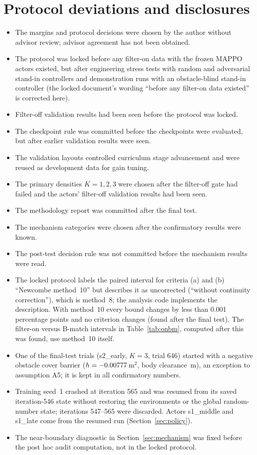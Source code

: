 \documentclass[journal]{IEEEtran}
\begin{document}
\section{Protocol deviations and disclosures}\label{sec:disclosures}
\begin{itemize}
\item The margins and protocol decisions were chosen by the author without advisor review; advisor agreement has not been obtained.
\item The protocol was locked before any filter-on data with the frozen MAPPO actors existed, but after engineering stress tests with random and adversarial stand-in controllers and demonstration runs with an obstacle-blind stand-in controller (the locked document's wording ``before any filter-on data existed'' is corrected here).
\item Filter-off validation results had been seen before the protocol was locked.
\item The checkpoint rule was committed before the checkpoints were evaluated, but after earlier validation results were seen.
\item The validation layouts controlled curriculum stage advancement and were reused as development data for gain tuning.
\item The primary densities $K=1,2,3$ were chosen after the filter-off gate had failed and the actors' filter-off validation results had been seen.
\item The methodology report was committed after the final test.
\item The mechanism categories were chosen after the confirmatory results were known.
\item The post-test decision rule was not committed before the mechanism results were read.
\item The locked protocol labels the paired interval for criteria (a) and (b) ``Newcombe method~10'' but describes it as uncorrected (``without continuity correction''), which is method~8; the analysis code implements the description. With method~10 every bound changes by less than 0.001 percentage points and no criterion changes (found after the final test). The filter-on versus B-match intervals in Table~\ref{tab:onbm}, computed after this was found, use method~10 itself.

\item One of the \TrialsTotal{} final-test trials (s2\_early, $K=3$, trial 646) started with a negative obstacle cover barrier ($h=-0.00777$\,m$^2$, body clearance \AfiveGap\,m), an exception to assumption A5; it is kept in all confirmatory numbers.
\item Training seed~1 crashed at iteration 565 and was resumed from its saved iteration-546 state without restoring the environments or the global random-number state; iterations 547--565 were discarded. Actors s1\_middle and s1\_late come from the resumed run (Section~\ref{sec:policy}).

\item The near-boundary diagnostic in Section~\ref{sec:mechanism} was fixed before the post hoc audit computation, not in the locked protocol.

\end{itemize}
\end{document}

